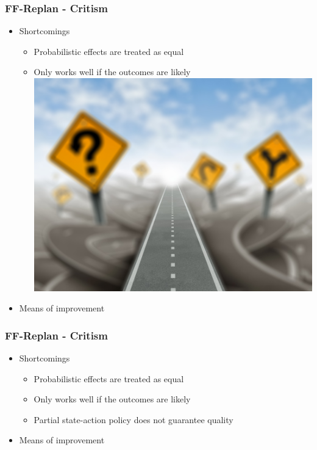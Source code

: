 \documentclass{beamer}
\let\origframetitle=\frametitle
\renewcommand\frametitle[1]{\origframetitle{\textbf{\large{\textrm{#1}}}}}
\begin{document}
\begin{frame}
  \frametitle{FF-Replan - Critism}

  \begin{itemize}
    \item Shortcomings
      \begin{itemize}
        \item Probabilistic effects are treated as equal
        \item Only works well if the outcomes are likely
          \includegraphics[scale=0.1]{images/direction-road-maze.jpg}
        \end{itemize}
    \item Means of improvement
  \end{itemize}
\end{frame}

\begin{frame}
  \frametitle{FF-Replan - Critism}

  \begin{itemize}
    \item Shortcomings
      \begin{itemize}
        \item Probabilistic effects are treated as equal
        \item Only works well if the outcomes are likely
	\item Partial state-action policy does not guarantee quality
      \end{itemize}
    \item Means of improvement
   \end{itemize}
\end{frame}
\end{document}
